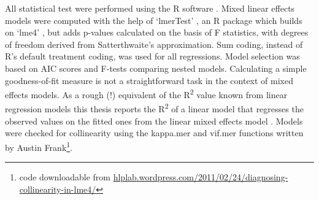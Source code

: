 All statistical test were performed using the R software \parencite{R}.
Mixed linear effects models were computed with the help of `lmerTest' \parencite{lmerTest}, an R package which builds on `lme4' \parencite{lme4}, but adds p-values calculated on the basis of F statistics, with degrees of freedom derived from Satterthwaite's approximation.
Sum coding, instead of R's default treatment coding, was used for all regressions.
Model selection was based on AIC scores and F-tests comparing nested models.
Calculating a simple goodness-of-fit measure is not a straightforward task in the context of mixed effects models.
As a rough (!) equivalent of the R\textsuperscript{2} value known from linear regression models this thesis reports the R\textsuperscript{2} of a linear model that regresses the observed values on the fitted ones from the linear mixed effects model \parencite[cf.][]{glmwiki}.
Models were checked for collinearity using the kappa.mer and vif.mer
functions written by Austin Frank\footnote{code downloadable from \url{hlplab.wordpress.com/2011/02/24/diagnosing-collinearity-in-lme4/}}.